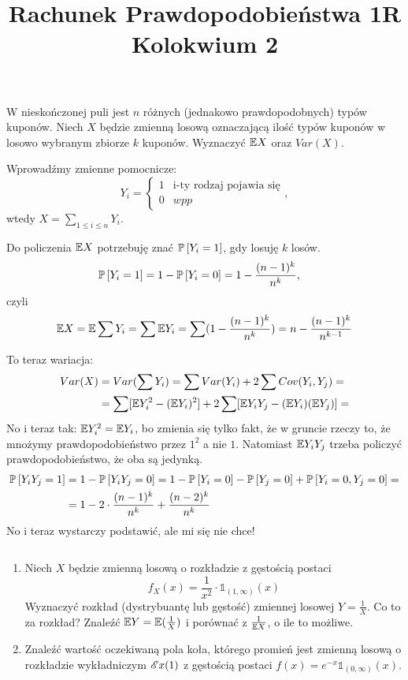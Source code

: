 \documentclass{article}
\title{Rachunek Prawdopodobieństwa 1R\\{\large Kolokwium 2}}
\author{}
\date{}
\begin{document}
\maketitle
\thispagestyle{empty}

\begin{problem}{}
  W nieskończonej puli jest $n$ różnych (jednakowo prawdopodobnych) typów kuponów. Niech $X$ będzie zmienną losową oznaczającą ilość typów kuponów w losowo wybranym zbiorze $k$ kuponów. Wyznaczyć $\mathbb{E} X$ oraz $Var(X)$.
\end{problem}

Wprowadźmy zmienne pomocnicze:
$$Y_i=\begin{cases}1&\text{i-ty rodzaj pojawia się}\\0&wpp\end{cases},$$
wtedy $X=\sum_{1\leq i\leq n} Y_i$.

Do policzenia $\mathbb{E} X$ potrzebuję znać $\prob{Y_i=1}$, gdy losuję $k$ losów.
\begin{align*}
  \prob{Y_i=1}&=1-\prob{Y_i=0}=1-\frac{(n-1)^k}{n^k},
\end{align*}
czyli
$$\mathbb{E} X=\mathbb{E}\sum Y_i=\sum \mathbb{E} Y_i=\sum (1-\frac{(n-1)^k}{n^k})=n-\frac{(n-1)^k}{n^{k-1}}$$

To teraz wariacja:
\begin{align*}
  Var(X)&=Var(\sum Y_i)=\sum Var(Y_i)+2\sum Cov(Y_i, Y_j)=\\
        &=\sum[\mathbb{E} Y_i^2-(\mathbb{E} Y_i)^2]+2\sum[\mathbb{E} Y_iY_j-(\mathbb{E} Y_i)(\mathbb{E} Y_j)]=\\
\end{align*}
No i teraz tak: $\mathbb{E} Y_i^2=\mathbb{E} Y_i$, bo zmienia się tylko fakt, że w gruncie rzeczy to, że mnożymy prawdopodobieństwo przez $1^2$ a nie $1$. Natomiast $\mathbb{E} Y_iY_j$ trzeba policzyć prawdopodobieństwo, że oba są jedynką.
\begin{align*}
  \prob{Y_iY_j=1}&=1-\prob{Y_iY_j=0}=1-\prob{Y_i=0}-\prob{Y_j=0}+\prob{Y_i=0, Y_j=0}=\\
                 &=1-2\cdot\frac{(n-1)^{k}}{n^{k}}+\frac{(n-2)^k}{n^k}
\end{align*}
No i teraz wystarczy podstawić, ale mi się nie chce!

\begin{problem}{}$ $\newline
  \begin{enumerate}[label=(\alph*)]
    \item Niech $X$ będzie zmienną losową o rozkładzie z gęstością postaci
      $$f_X(x)=\frac{1}{x^2}\cdot\mathds{1}_{(1,\infty)}(x)$$
      Wyznaczyć rozkład (dystrybuantę lub gęstość) zmiennej losowej $Y=\frac{1}{X}$. Co to za rozkład? Znaleźć $\mathbb{E} Y=\mathbb{E} (\frac{1}{X})$ i porównać z $\frac{1}{\mathbb{E} X}$, o ile to możliwe.
    \item Znaleźć wartość oczekiwaną pola koła, którego promień jest zmienną losową o rozkładzie wykładniczym $\mathcal{E}x(1)$ z gęstością postaci $f(x)=e^{-x}\mathds{1}_{(0,\infty)}(x)$.
  \end{enumerate}
\end{problem}
\end{document}
